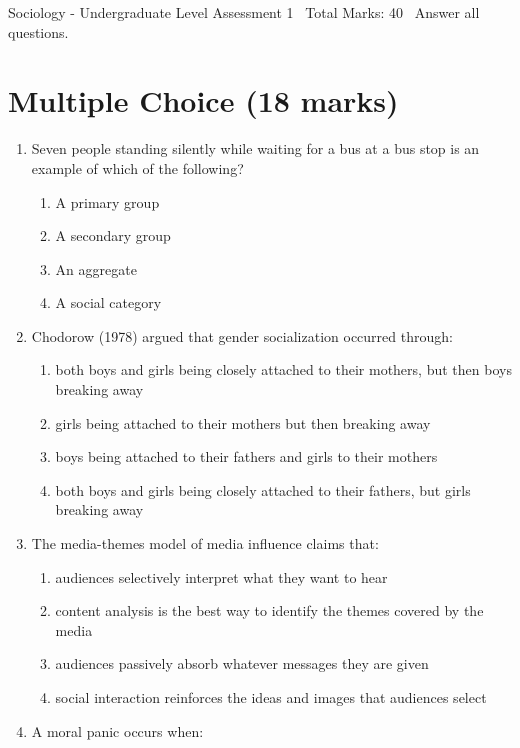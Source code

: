 \documentclass[12pt]{article}
\begin{document}
\begin{center}
Sociology - Undergraduate Level Assessment 1 \
Total Marks: 40 \
Answer all questions.
\end{center}

\section*{Multiple Choice (18 marks)}
\begin{enumerate}[label=\arabic*.]
\item Seven people standing silently while waiting for a bus at a bus stop is an example of which of the following?
\begin{enumerate}[label=(\alph*)]
    \item A primary group
    \item A secondary group
    \item An aggregate
    \item A social category
\end{enumerate}
\item Chodorow (1978) argued that gender socialization occurred through:
\begin{enumerate}[label=(\alph*)]
    \item both boys and girls being closely attached to their mothers, but then boys breaking away
    \item girls being attached to their mothers but then breaking away
    \item boys being attached to their fathers and girls to their mothers
    \item both boys and girls being closely attached to their fathers, but girls breaking away
\end{enumerate}
\item The media-themes model of media influence claims that:
\begin{enumerate}[label=(\alph*)]
    \item audiences selectively interpret what they want to hear
    \item content analysis is the best way to identify the themes covered by the media
    \item audiences passively absorb whatever messages they are given
    \item social interaction reinforces the ideas and images that audiences select
\end{enumerate}
\item A moral panic occurs when:
\begin{enumerate}[label=(\alph*)]

\end{enumerate}
\end{enumerate}
\end{document}
